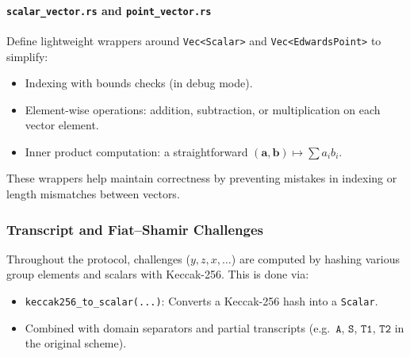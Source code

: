 \paragraph{\texttt{scalar\_vector.rs} and \texttt{point\_vector.rs}}
Define lightweight wrappers around \texttt{Vec<Scalar>} and \texttt{Vec<EdwardsPoint>} to simplify:
\begin{itemize}
    \item Indexing with bounds checks (in debug mode). %
    \item Element-wise operations: addition, subtraction, or multiplication on each vector element. %
    \item Inner product computation: a straightforward $(\mathbf{a},\mathbf{b}) \mapsto \sum a_i b_i$. %
\end{itemize}

These wrappers help maintain correctness by preventing mistakes in indexing or length mismatches between vectors.  

\subsubsection{Transcript and Fiat--Shamir Challenges}
Throughout the protocol, challenges ($y, z, x, \dots$) are computed by hashing various group elements and scalars with Keccak-256.  This is done via:
\begin{itemize}
    \item \texttt{keccak256\_to\_scalar(...)}: Converts a Keccak-256 hash into a \texttt{Scalar}. %
    \item Combined with domain separators and partial transcripts (e.g.\ $\texttt{A}$, $\texttt{S}$, $\texttt{T1}$, $\texttt{T2}$ in the original scheme). %
\end{itemize}

